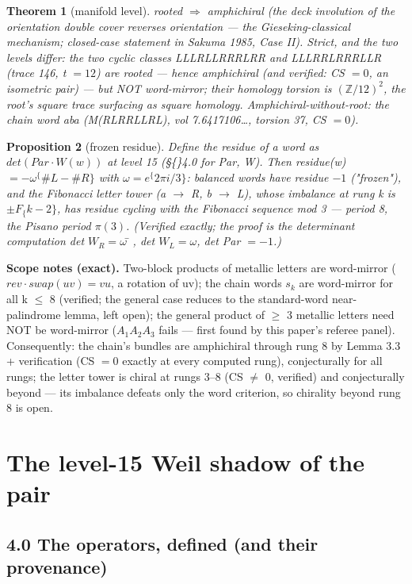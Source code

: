 \documentclass[11pt]{article}
\theoremstyle{plain}
\newtheorem{theorem}{Theorem}[section]
\newtheorem{proposition}[theorem]{Proposition}
\theoremstyle{definition}
\theoremstyle{remark}
\begin{document}
\begin{theorem}[manifold level]
rooted \(\Longrightarrow \) amphichiral (the deck involution of the orientation double cover reverses orientation — the Gieseking-classical mechanism; closed-case statement in Sakuma 1985, Case II). Strict, and the two levels differ: the two cyclic classes LLLRLLRRRLRR and LLLRRLRRRLLR (trace 146, t \(= 12\)) are rooted — hence amphichiral (and verified: CS \(= 0\), an isometric pair) — but NOT word-mirror; their homology torsion is \((\mathbb{Z}/12)^{2}\), the root's square trace surfacing as square homology. Amphichiral-without-root: the chain word aba (M(RLRRLLRL), vol 7.6417106…, torsion 37, CS \(= 0\)).
\end{theorem}

\begin{proposition}[frozen residue]
Define the residue of a word as \(det(Par\cdot W(w))\) at level 15 (\S\{\}4.0 for Par, W). Then residue(w) \(= -\omega ^\{\#L-\#R\}\) with \(\omega  = e^\{2\pi i/3\}\): balanced words have residue \(-1\) ("frozen"), and the Fibonacci letter tower (a \(\to \) R, b \(\to \) L), whose imbalance at rung k is \(\pm F_\{k-2\}\), has residue cycling with the Fibonacci sequence mod 3 — period 8, the Pisano period \(\pi (3)\). (Verified exactly; the proof is the determinant computation det \(W_{R} = \omega ̄\), det \(W_{L} = \omega \), det Par \(= -1\).)
\end{proposition}

\textbf{Scope notes (exact).} Two-block products of metallic letters are word-mirror (\(rev\cdot swap(uv) = vu\), a rotation of uv); the chain words \(s_{k}\) are word-mirror for all k \(\le \) 8 (verified; the general case reduces to the standard-word near-palindrome lemma, left open); the general product of \(\ge \) 3 metallic letters need NOT be word-mirror (\(A_{1}A_{2}A_{3}\) fails — first found by this paper's referee panel). Consequently: the chain's bundles are amphichiral through rung 8 by Lemma 3.3 + verification (CS \(= 0\) exactly at every computed rung), conjecturally for all rungs; the letter tower is chiral at rungs 3–8 (CS \(\neq \) 0, verified) and conjecturally beyond — its imbalance defeats only the word criterion, so chirality beyond rung 8 is open.

\section{The level-15 Weil shadow of the pair}

\subsection{4.0 The operators, defined (and their provenance)}
\end{document}
